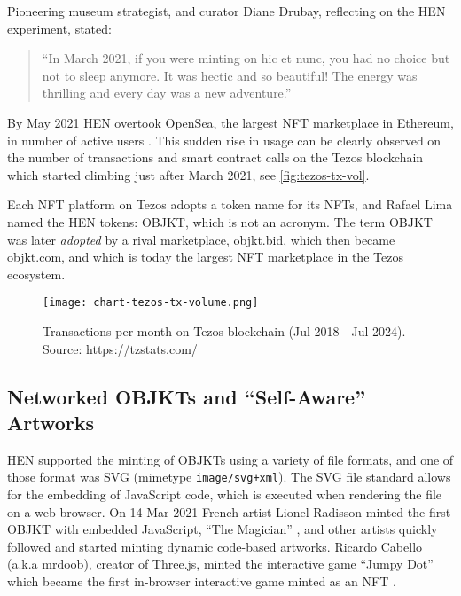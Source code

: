Pioneering museum strategist, and curator Diane Drubay, reflecting on the HEN experiment, stated:

\begin{quotation}
``In March 2021, if you were minting on hic et nunc, you had no choice but not to sleep anymore. It was hectic and so beautiful! The energy was thrilling and every day was a new adventure.'' \cite{drubayHowHicNunc2021}
\end{quotation}


By May 2021 HEN overtook OpenSea, the largest NFT marketplace in Ethereum, in number of active users \cite{nelsonWhereAreYour2022} \cite{evansBrazilDIYEcofriendly2021}. This sudden rise in usage can be clearly observed on the number of transactions and smart contract calls on the Tezos blockchain which started climbing just after March 2021, see \autoref{fig:tezos-tx-vol}.

Each NFT platform on Tezos adopts a token name for its NFTs, and Rafael Lima named the HEN tokens: \gls{OBJKT}, which is not an acronym.
The term OBJKT was later \emph{adopted} by a rival marketplace, objkt.bid, which then became objkt.com, and which is today the largest NFT marketplace in the Tezos ecosystem.

\begin{figure}[h]
    \centering
    \texttt{[image: chart-tezos-tx-volume.png]}
    \caption[Transactions per month on Tezos blockchain]{Transactions per month on Tezos blockchain (Jul 2018 - Jul 2024). Source: https://tzstats.com/}
    \label{fig:tezos-tx-vol}
\end{figure}

\subsection*{Networked OBJKTs and ``Self-Aware'' Artworks}

HEN supported the minting of OBJKTs using a variety of file formats, and one of those format was SVG (mimetype \texttt{image/svg+xml}). The SVG file standard allows for the embedding of JavaScript code, which is executed when rendering the file on a web browser.  On 14 Mar 2021 French artist Lionel Radisson minted the first OBJKT with embedded JavaScript, ``The Magician''  \cite{makio135Magician2021}, and other artists quickly followed and started minting dynamic code-based artworks. Ricardo Cabello (a.k.a mrdoob), creator of Three.js, minted the interactive game ``Jumpy Dot'' \cite{mrdoobJumpyDot2021} which became the first in-browser interactive game minted as an NFT \cite{rusherWhatDoesIt2021}.

